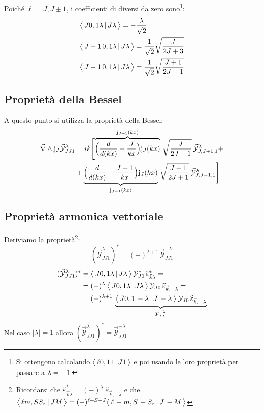 \subsection{\CG}
Poiché $\ell = J, J\pm 1$, i coefficienti di \CG{} diversi da zero sono\footnote{Si ottengono calcolando $\bigl\langle\, \ell 0, 1 1\, |\, J1\, \bigr\rangle$ e poi usando le loro proprietà per passare a $\lambda = -1$.}:
\begin{align*}
	&\bigl\langle\, J0,1\lambda\, |\, J\lambda\, \bigr\rangle = - \frac{\lambda}{\sqrt{2}}\\
	&\bigl\langle\, J+1\,0,1\lambda\, |\, J\lambda\, \bigr\rangle = \frac{1}{\sqrt{2}} \sqrt{\frac{J}{2J+3}}\\
	&\bigl\langle\, J-1\,0,1\lambda\, |\, J\lambda\, \bigr\rangle = \frac{1}{\sqrt{2}} \sqrt{\frac{J+1}{2J-1}}
\end{align*}
\subsection{Proprietà della Bessel}
A questo punto si utilizza la proprietà della Bessel:
\begin{align*}
	\vec{\nabla}\land\mathrm{j}_J\vec{\mathcal{Y}}_{JJ1}^\lambda &= ik \Biggl [ \overbrace{\Bigl ( \frac{d}{d(kx)} - \frac{J}{kx} \Bigr ) \mathrm{j}_{J}(kx) }^{\mathrm{j}_{J+1}(kx)}\, \sqrt{\frac{J}{2J+1}}\, \vec{\mathcal{Y}}_{J,J+1,1}^\lambda + \\
	&+ \underbrace{\Bigl ( \frac{d}{d(kx)} - \frac{J+1}{kx} \Bigr ) \mathrm{j}_{J}(kx) }_{\mathrm{j}_{J-1}(kx)}\, \sqrt{\frac{J+1}{2J+1}}\, \vec{\mathcal{Y}}_{J,J-1,1}^\lambda \Biggr ]
\end{align*}
\subsection{Proprietà armonica vettoriale}\label{compl-passaggi-armonica}
Deriviamo la proprietà\footnote{Ricordarsi che $\widehat{\varepsilon}_{\vec{k}\lambda}^* = (-)^\lambda \; \widehat{\varepsilon}_{\vec{k},-\lambda}$ e che $\bigl\langle\, \ell m, S S_z\, |\, J M\, \bigr\rangle = (-)^{\ell+S-J} \bigl\langle\, \ell\, -m, S\, -S_z\, |\, J \,-M\, \bigr\rangle $}:
$$(\vec{\mathcal{Y}}_{JJ1}^\lambda)^* = (-)^{\lambda+1}\,\vec{\mathcal{Y}}^{-\lambda}_{JJ1}$$
\begin{align*}
	(\vec{\mathcal{Y}}_{JJ1}^\lambda)^* &= \bigl\langle\, J0,1\lambda\, |\, J\lambda\, \bigr\rangle \, \mathcal{Y}_{J0}^* \, \widehat{\varepsilon}_{\vec{k}\lambda}^* = \\
	&= (-)^\lambda \: \bigl\langle\, J0,1\lambda\, |\, J\lambda\, \bigr\rangle \, \mathcal{Y}_{J0} \, \widehat{\varepsilon}_{\vec{k},-\lambda} = \\
	&= (-)^{\lambda+1} \: \underbrace{\bigl\langle\, J0,1\,-\lambda\, |\, J\,-\lambda\, \bigr\rangle \, \mathcal{Y}_{J0} \, \widehat{\varepsilon}_{\vec{k},-\lambda}}_{\vec{\mathcal{Y}}_{JJ1}^{-\lambda}}
\end{align*}
Nel caso $|\lambda|=1$ allora $(\vec{\mathcal{Y}}_{JJ1}^\lambda)^* = \vec{\mathcal{Y}}_{JJ1}^{-\lambda}$.

